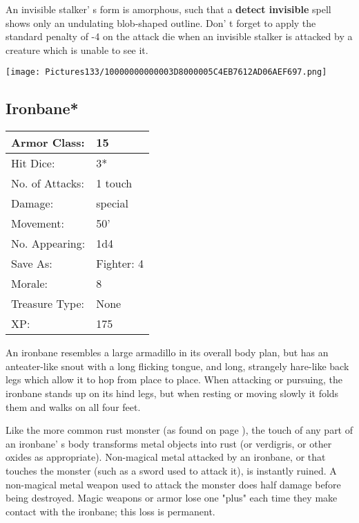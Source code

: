 \documentclass[a4paper,twoside,openany,10pt]{book}
\begin{document}
\begin{multicols}{2}
An invisible stalker' s form is amorphous, such that a \textbf{detect invisible} spell shows only an undulating blob-shaped outline. Don' t forget to apply the standard penalty of -4 on the attack die when an invisible stalker is attacked by a creature which is unable to see it.


\begin{center}
	\texttt{[image: Pictures133/10000000000003D8000005C4EB7612AD06AEF697.png]}
\end{center}

\subsection*{Ironbane*}\label{ironbane}

\begin{tabularx}{0.50\textwidth}{@{}lX@{}}
Armor Class: & 15 \\\hline
Hit Dice: & 3* \\\hline
No. of Attacks: & 1 touch \\\hline
Damage: & special \\\hline
Movement: & 50' \\\hline
No. Appearing: & 1d4 \\\hline
Save As: & Fighter: 4 \\\hline
Morale: & 8 \\\hline
Treasure Type: & None \\\hline
XP: & 175 \\\hline
\end{tabularx}\medskip

An ironbane resembles a large armadillo in its overall body plan, but has an anteater-like snout with a long flicking tongue, and long, strangely hare-like back legs which allow it to hop from place to place. When attacking or pursuing, the ironbane stands up on its hind legs, but when resting or moving slowly it folds them and walks on all four feet.

Like the more common rust monster (as found on page \hyperlink{rust-monster}{\pageref{rust-monster}}), the touch of any part of an ironbane' s body transforms metal objects into rust (or verdigris, or other oxides as appropriate). Non-magical metal attacked by an ironbane, or that touches the monster (such as a sword used to attack it), is instantly ruined. A non-magical metal weapon used to attack the monster does half damage before being destroyed. Magic weapons or armor lose one "plus" each time they make contact with the ironbane; this loss is permanent.


\end{multicols}
\end{document}
